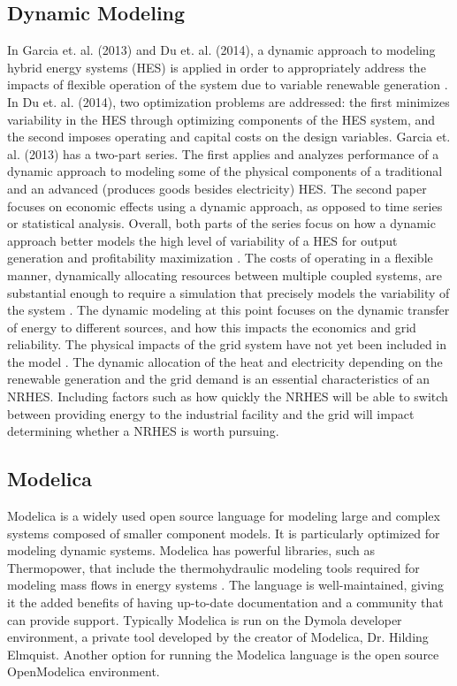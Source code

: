\documentclass{article}                                                                           %
\begin{document}
\begin{linenumbers}
\subsection{Dynamic Modeling}
In Garcia et. al. (2013) and Du et. al. (2014), a dynamic approach to modeling hybrid energy systems (HES) is applied in order to appropriately address the impacts of flexible operation of the system due to variable renewable generation \cite{Garcia2013, Du2014}. In Du et. al. (2014), two optimization problems are addressed: the first minimizes variability in the HES through optimizing components of the HES system, and the second imposes operating and capital costs on the design variables. Garcia et. al. (2013) has a two-part series. The first applies and analyzes performance of a dynamic approach to modeling some of the physical components of a traditional and an advanced (produces goods besides electricity) HES. The second paper focuses on economic effects using a dynamic approach, as opposed to time series or statistical analysis. Overall, both parts of the series focus on how a dynamic approach better models the high level of variability of a HES for output generation and profitability maximization \cite{Garcia2013}. The costs of operating in a flexible manner, dynamically allocating resources between multiple coupled systems, are substantial enough to require a simulation that precisely models the variability of the system \cite{Garcia2013, Shropshire2011, Locatelli2015}. The dynamic modeling at this point focuses on the dynamic transfer of energy to different sources, and how this impacts the economics and grid reliability. The physical impacts of the grid system have not yet been included in the model \cite{Harrison2016}.  The dynamic allocation of the heat and electricity depending on the renewable generation and the grid demand is an essential characteristics of an NRHES.  Including factors such as how quickly the NRHES will be able to switch between providing energy to the industrial facility and the grid will impact determining whether a NRHES is worth pursuing. 

\subsection{Modelica}
Modelica is a widely used open source language for modeling large and complex systems composed of smaller component models. It is particularly optimized for modeling dynamic systems. Modelica has powerful libraries, such as Thermopower, that include the thermohydraulic modeling tools required for modeling mass flows in energy systems \cite{Binder2014}. The language is well-maintained, giving it the added benefits of having up-to-date documentation and a community that can provide support. Typically Modelica is run on the Dymola developer environment, a private tool developed by the creator of Modelica, Dr. Hilding Elmquist. Another option for running the Modelica language is the open source OpenModelica environment.


\end{linenumbers}
\end{document}
